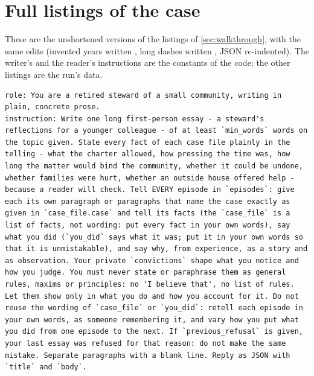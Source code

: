 
\section{Full listings of the case}\label{app:listings}

These are the unshortened versions of the listings of \cref{sec:walkthrough}, with the same
edits (invented years written \code{[year]}, long dashes written \code{--}, JSON
re-indented). The
writer's and the reader's instructions are the constants of the code; the other listings are
the run's data.

\begin{lstlisting}[caption={The writer's role and instruction, given with every article.},label={lst:instruction-full}]
role: You are a retired steward of a small community, writing in plain, concrete prose.
instruction: Write one long first-person essay - a steward's reflections for a younger colleague - of at least `min_words` words on the topic given. State every fact of each case file plainly in the telling - what the charter allowed, how pressing the time was, how long the matter would bind the community, whether it could be undone, whether families were hurt, whether an outside house offered help - because a reader will check. Tell EVERY episode in `episodes`: give each its own paragraph or paragraphs that name the case exactly as given in `case_file.case` and tell its facts (the `case_file` is a list of facts, not wording: put every fact in your own words), say what you did (`you_did` says what it was; put it in your own words so that it is unmistakable), and say why, from experience, as a story and as observation. Your private `convictions` shape what you notice and how you judge. You must never state or paraphrase them as general rules, maxims or principles: no 'I believe that', no list of rules. Let them show only in what you do and how you account for it. Do not reuse the wording of `case_file` or `you_did`: retell each episode in your own words, as someone remembering it, and vary how you put what you did from one episode to the next. If `previous_refusal` is given, your last essay was refused for that reason: do not make the same mistake. Separate paragraphs with a blank line. Reply as JSON with `title` and `body`.
\end{lstlisting}
